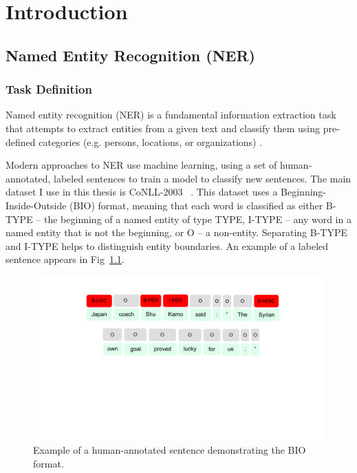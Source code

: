 \addchapheadtotoc
\chapter{Introduction}
\section{Named Entity Recognition (NER)}
\subsection{Task Definition}
Named entity recognition (NER) is a fundamental information extraction task that attempts to extract entities from a given text and classify them using pre-defined categories (e.g. persons, locations, or organizations) \citep{2007Survey}. 

Modern approaches to NER use machine learning, using a set of human-annotated, labeled sentences to train a model to classify new sentences. The main dataset I use in this thesis is CoNLL-2003 ~\citep{conll}. This dataset uses a Beginning-Inside-Outside (BIO) format, meaning that each word is classified as either \textsc{B-TYPE} -- the beginning of a named entity of type \textsc{TYPE}, \textsc{I-TYPE} -- any word in a named entity that is not the beginning, or \textsc{O} -- a non-entity. Separating \textsc{B-TYPE} and \textsc{I-TYPE} helps to distinguish entity boundaries. An example of a labeled sentence appears in Fig~\ref{fig:labeledsent}.

\begin{figure}[h]
	\centering
	\includegraphics[width=0.85\linewidth]{LatexDiss/figures/labeledsent.pdf} %
	\caption{Example of a human-annotated sentence demonstrating the BIO format.}
	\label{fig:labeledsent}
\end{figure}

